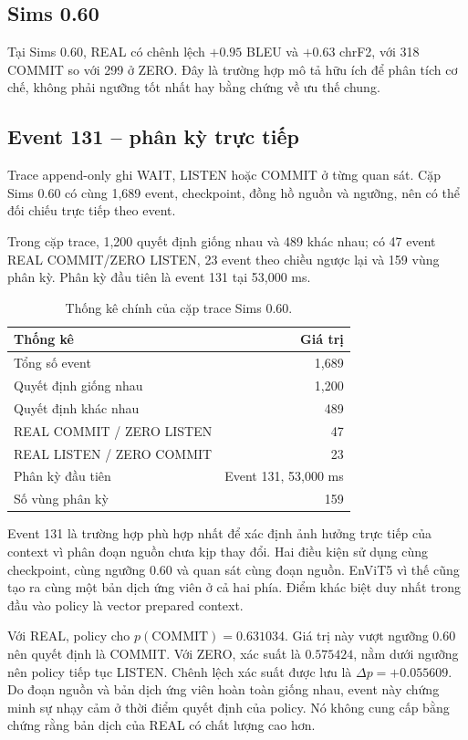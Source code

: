 \documentclass[11pt,a4paper]{article}
\numberwithin{figure}{section}
\numberwithin{table}{section}
\begin{document}
\subsection{Sims 0.60}
Tại Sims 0.60, REAL có chênh lệch $+0.95$ BLEU và $+0.63$ chrF2, với 318 COMMIT so với 299 ở ZERO. Đây là trường hợp mô tả hữu ích để phân tích cơ chế, không phải ngưỡng tốt nhất hay bằng chứng về ưu thế chung.

\subsection{Event 131 -- phân kỳ trực tiếp}
Trace append-only ghi WAIT, LISTEN hoặc COMMIT ở từng quan sát. Cặp Sims 0.60 có cùng 1,689 event, checkpoint, đồng hồ nguồn và ngưỡng, nên có thể đối chiếu trực tiếp theo event.

Trong cặp trace, 1,200 quyết định giống nhau và 489 khác nhau; có 47 event REAL COMMIT/ZERO LISTEN, 23 event theo chiều ngược lại và 159 vùng phân kỳ. Phân kỳ đầu tiên là event 131 tại 53,000 ms.

\begin{table}[!htbp]
  \centering
  \caption{Thống kê chính của cặp trace Sims 0.60.}
  \label{tab:trace-statistics}
  \begin{tabularx}{0.88\textwidth}{@{}Y r@{}}
    \toprule
    \textbf{Thống kê} & \textbf{Giá trị} \\
    \midrule
    Tổng số event & 1,689 \\
    Quyết định giống nhau & 1,200 \\
    Quyết định khác nhau & 489 \\
    REAL COMMIT / ZERO LISTEN & 47 \\
    REAL LISTEN / ZERO COMMIT & 23 \\
    Phân kỳ đầu tiên & Event 131, 53,000 ms \\
    Số vùng phân kỳ & 159 \\
    \bottomrule
  \end{tabularx}
\end{table}

Event 131 là trường hợp phù hợp nhất để xác định ảnh hưởng trực tiếp của context vì phân đoạn nguồn chưa kịp thay đổi. Hai điều kiện sử dụng cùng checkpoint, cùng ngưỡng 0.60 và quan sát cùng đoạn nguồn. EnViT5 vì thế cũng tạo ra cùng một bản dịch ứng viên ở cả hai phía. Điểm khác biệt duy nhất trong đầu vào policy là vector prepared context.

Với REAL, policy cho $p(\mathrm{COMMIT})=0.631034$. Giá trị này vượt ngưỡng 0.60 nên quyết định là COMMIT. Với ZERO, xác suất là $0.575424$, nằm dưới ngưỡng nên policy tiếp tục LISTEN. Chênh lệch xác suất được lưu là $\Delta p=+0.055609$. Do đoạn nguồn và bản dịch ứng viên hoàn toàn giống nhau, event này chứng minh sự nhạy cảm ở thời điểm quyết định của policy. Nó không cung cấp bằng chứng rằng bản dịch của REAL có chất lượng cao hơn.
\end{document}
